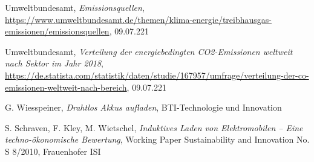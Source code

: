 \begin{thebibliography}{99}

Umweltbundesamt, \newline
{\itshape Emissionsquellen}, \newline
\url{https://www.umweltbundesamt.de/themen/klima-energie/treibhausgas-emissionen/emissionsquellen}, 09.07.221

Umweltbundesamt, \newline
{\itshape Verteilung der energiebedingten CO2-Emissionen weltweit nach Sektor im Jahr 2018}, \newline
\url{https://de.statista.com/statistik/daten/studie/167957/umfrage/verteilung-der-co-emissionen-weltweit-nach-bereich}, 09.07.221

G. Wiesspeiner, \newline
{\itshape Drahtlos Akkus aufladen}, \newline
BTI-Technologie und Innovation

S. Schraven, F. Kley, M. Wietschel, \newline
{\itshape Induktives Laden von Elektromobilen –
	Eine techno-ökonomische Bewertung}, \newline
Working Paper Sustainability and Innovation
No. S 8/2010, Frauenhofer ISI


\end{thebibliography}




